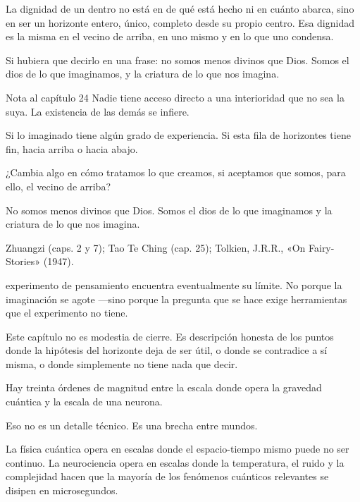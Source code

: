 La dignidad de un dentro no está en de qué está hecho ni en cuánto abarca, sino en ser un horizonte entero, único, completo desde su propio centro. Esa dignidad es la misma en el vecino de arriba, en uno mismo y en lo que uno condensa.

Si hubiera que decirlo en una frase: no somos menos divinos que Dios. Somos el dios de lo que imaginamos, y la criatura de lo que nos imagina.

\begin{notacap}{Nota al capítulo 24}
 Nadie tiene acceso directo a una interioridad que no sea la suya. La existencia de las demás se infiere.

 Si lo imaginado tiene algún grado de experiencia. Si esta fila de horizontes tiene fin, hacia arriba o hacia abajo.

 ¿Cambia algo en cómo tratamos lo que creamos, si aceptamos que somos, para ello, el vecino de arriba?

 No somos menos divinos que Dios. Somos el dios de lo que imaginamos y la criatura de lo que nos imagina.

 Zhuangzi (caps. 2 y 7); Tao Te Ching (cap. 25); Tolkien, J.R.R., «On Fairy-Stories» (1947).
\end{notacap}
\noindent {} experimento de pensamiento encuentra eventualmente su límite. No porque la imaginación se agote —sino porque la pregunta que se hace exige herramientas que el experimento no tiene.

Este capítulo no es modestia de cierre. Es descripción honesta de los puntos donde la hipótesis del horizonte deja de ser útil, o donde se contradice a sí misma, o donde simplemente no tiene nada que decir.

\noindent Hay treinta órdenes de magnitud entre la escala donde opera la gravedad cuántica y la escala de una neurona.

Eso no es un detalle técnico. Es una brecha entre mundos.

La física cuántica opera en escalas donde el espacio-tiempo mismo puede no ser continuo. La neurociencia opera en escalas donde la temperatura, el ruido y la complejidad hacen que la mayoría de los fenómenos cuánticos relevantes se disipen en microsegundos.

